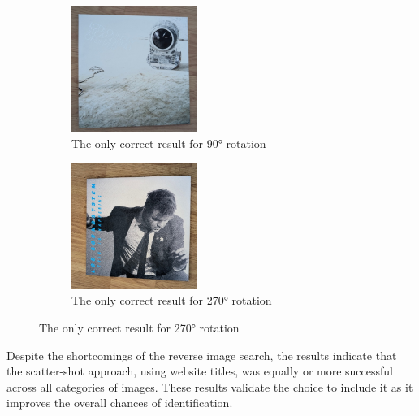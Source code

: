 \begin{figure} [H]
    \captionsetup{justification=centering}
    \centering
    \begin{subfigure}[t]{0.45\textwidth}
        \centering
        \includegraphics[width=0.45\textwidth]{figures/test_albums/Sound_Of_Silver_Rotated - 90.jpg}
        \caption{The only correct result for 90° rotation}
        \label{fig:sos_rotated_90}
    \end{subfigure}
    \begin{subfigure}[t]{0.45\textwidth}
        \centering
        \includegraphics[width=0.45\textwidth]{figures/test_albums/This_Is_Happening_Rotated - 270.jpg}
        \caption{The only correct result for 270° rotation}
        \label{fig:tih_rotated_270}
    \end{subfigure}
\end{figure}

Despite the shortcomings of the reverse image search, the results indicate that the scatter-shot approach, using website titles, was equally or more successful across all categories of images. These results validate the choice to include it as it improves the overall chances of identification.

